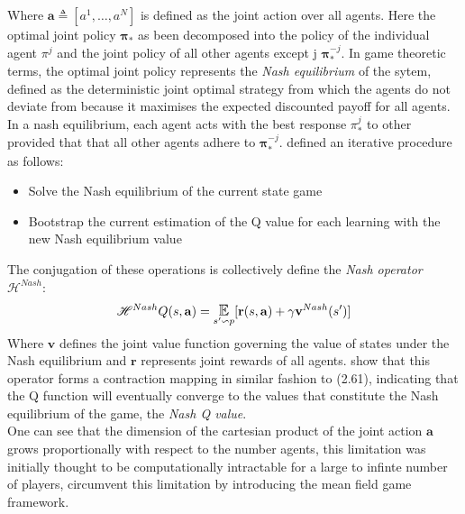 Where $\mathbf{a} \triangleq [a^1, \hdots, a^N]$ is defined as the joint action over all agents.
Here the optimal joint policy $\boldsymbol \pi_*$ as been decomposed into the policy of the individual
agent $\pi^j$ and the joint policy of all other agents except j $\boldsymbol \pi_*^{-j}$.
In game theoretic terms, the optimal joint policy represents the \emph{Nash equilibrium} of the
sytem, defined as the deterministic joint optimal strategy from which the agents do not deviate from
because it maximises the expected discounted payoff for all agents.
In a nash equilibrium, each agent acts with the best response $\pi^j_*$ to other provided that
that all other agents adhere to $\boldsymbol \pi^{-j}_*$. \cite{Hu2003} defined an iterative 
procedure as follows:
\begin{itemize}
    \item Solve the Nash equilibrium of the current state game
    \item Bootstrap the current estimation of the Q value for each learning with the new Nash equilibrium value
\end{itemize}
The conjugation of these operations is collectively define the \emph{Nash operator} $\mathscr{H}^{Nash}$:
\begin{equation}
    \mathscr{H}^{Nash}Q(s, \mathbf{a}) = \E_{s' \backsim p}[\mathbf{r}(s, \mathbf{a}) + \gamma \mathbf{v}^{Nash}(s')]
\end{equation}
Where $\mathbf{v}$ defines the joint value function governing the value of states under the Nash equilibrium and $\mathbf{r}$
represents joint rewards of all agents.
\cite{Hu2003} show that this operator forms a contraction mapping in similar fashion to (2.61), indicating
that the Q function will eventually converge to the values that constitute the Nash equilibrium
of the game, the \emph{Nash Q value}. \\

One can see that the dimension of the cartesian product of the joint action $\mathbf{a}$ 
grows proportionally with respect to the number agents, this limitation was initially thought
to be computationally intractable for a large to infinte number of players, \cite{Yang2018}
circumvent this limitation by introducing the mean field game framework.
